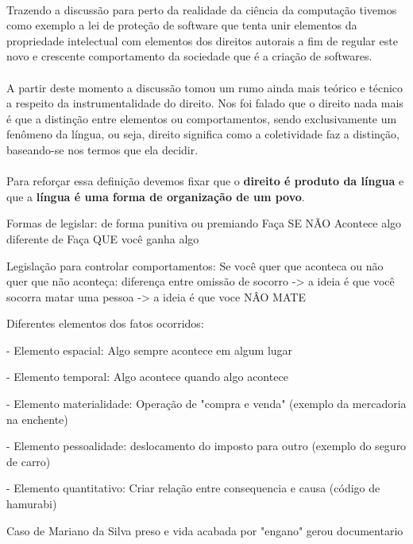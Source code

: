 \documentclass[12pt]{article}
\begin{document}
	\paragraph{}
		Trazendo a discussão para perto da realidade da ciência da computação
		tivemos como exemplo a lei de proteção de software que tenta
		unir elementos da propriedade intelectual com elementos dos
		direitos autorais a fim de regular este novo e crescente comportamento
		da sociedade que é a criação de softwares.
	\paragraph{}
		A partir deste momento a discussão tomou um rumo ainda mais teórico e
		técnico a respeito da instrumentalidade do direito. Nos foi falado que
		o direito nada mais é que a distinção entre elementos ou comportamentos,
		sendo exclusivamente um fenômeno da língua, ou seja, direito significa
		como a coletividade faz a distinção, baseando-se nos termos que ela 
		decidir.
	\paragraph{}
		Para reforçar essa definição devemos fixar que o \textbf{direito é
		produto da língua} e que a \textbf{língua é uma forma de organização de 
		um povo}.

Formas de legislar: de forma punitiva ou premiando
Faça SE NÃO Acontece algo diferente de Faça QUE você ganha algo

Legislação para controlar comportamentos: Se você quer que aconteca ou não quer
que não aconteça:
diferença entre omissão de socorro -> a ideia é que você socorra
matar uma pessoa -> a ideia é que voce NÂO MATE	

Diferentes elementos dos fatos ocorridos:

- Elemento espacial: Algo sempre acontece em algum lugar

- Elemento temporal: Algo acontece quando algo acontece

- Elemento materialidade: Operação de "compra e venda" (exemplo da mercadoria
na enchente)

- Elemento pessoalidade: deslocamento do imposto para outro (exemplo do seguro
de carro)

- Elemento quantitativo: Criar relação entre consequencia e causa (código de
hamurabi)

Caso de Mariano da Silva preso e vida acabada por "engano" gerou documentario
\end{document}
